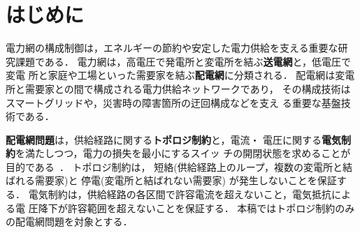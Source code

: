 \section{はじめに}\label{chap:intro}

電力網の構成制御は，エネルギーの節約や安定した電力供給を支える重要な研
究課題である．
電力網は，高電圧で発電所と変電所を結ぶ\textbf{送電網}と，低電圧で変電
所と家庭や工場といった需要家を結ぶ\textbf{配電網}に分類される．
配電網は変電所と需要家との間で構成される電力供給ネットワークであり，
その構成技術はスマートグリッドや，災害時の障害箇所の迂回構成などを支え
る重要な基盤技術である．

\textbf{配電網問題}は，供給経路に関する\textbf{トポロジ制約}と，電流・
電圧に関する\textbf{電気制約}を満たしつつ，電力の損失を最小にするスイッ
チの開閉状態を求めることが目的である~\cite{Hayashi:dnet:model}．
トポロジ制約は，
短絡(供給経路上のループ，複数の変電所と結ばれる需要家)と
停電(変電所と結ばれない需要家)
が発生しないことを保証する．
電気制約は，供給経路の各区間で許容電流を超えないこと，電気抵抗による電
圧降下が許容範囲を超えないことを保証する．
本稿ではトポロジ制約のみの配電網問題を対象とする．




%  


% 



